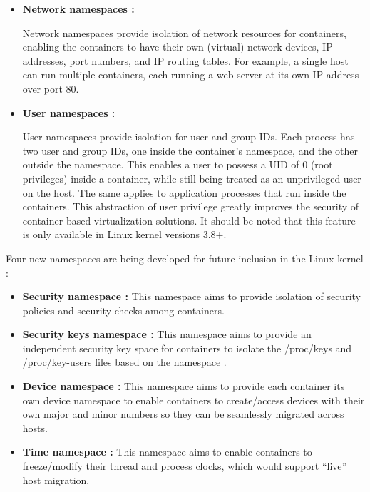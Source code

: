 \begin{itemize}
\item \textbf{Network namespaces :}

Network namespaces provide isolation of network resources for containers, enabling the containers to have their own (virtual) network devices, IP addresses, port numbers, and IP routing tables. For example, a single host can run multiple containers, each running a web server at its own IP address over port 80.


\item \textbf{User namespaces :}

User namespaces provide isolation for user and group IDs. Each process has two user and group IDs, one inside the container's namespace, and the other outside the namespace. This enables a user to possess a UID of 0 (root privileges) inside a container, while still being treated as an unprivileged user on the host. The same applies to application processes that run inside the containers. This abstraction of user privilege greatly improves the security of container-based virtualization solutions. It should be noted that this feature is only available in Linux kernel versions 3.8+.
\end{itemize}


Four new namespaces are being developed for future inclusion in the Linux kernel \cite{linux_namespaces_plan}:


\begin{itemize}

\item \textbf{Security namespace :} This namespace aims to provide isolation of security policies and security checks among containers.

\item \textbf{Security keys namespace :} This namespace aims to provide an independent security key space for containers to isolate the /proc/keys and /proc/key-users files based on the namespace \cite{key_namespace}.

\item \textbf{Device namespace :} This namespace aims to provide each container its own device namespace to enable containers to create/access devices with their own major and minor numbers so they can be seamlessly migrated across hosts.

\item \textbf{Time namespace :} This namespace aims to enable containers to freeze/modify their thread and process clocks, which would support ``live'' host migration. 
\end{itemize}




